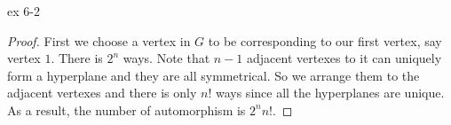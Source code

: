 \begin{exercise}


ex 6-2


\end{exercise}

\begin{proof}

First we choose a vertex in $G$ to be corresponding to our first vertex, say vertex $1$. There is $2^n$ ways. Note that $n-1$ adjacent vertexes to it can uniquely form a hyperplane and they are all symmetrical. So we arrange them to the adjacent vertexes and there is only $n!$ ways since all the hyperplanes are unique.
As a result, the number of automorphism is $2^nn!$.
\end{proof}